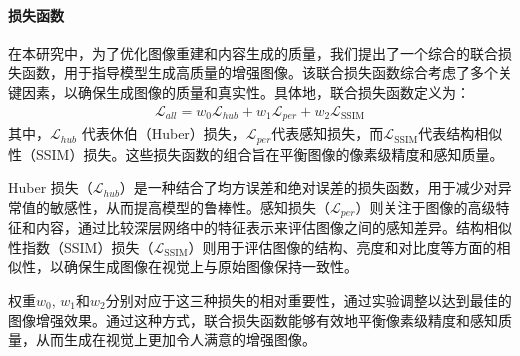 \documentclass[a4paper]{ctexart}
\begin{document}
	
	\paragraph{损失函数}
	
	在本研究中，为了优化图像重建和内容生成的质量，我们提出了一个综合的联合损失函数，用于指导模型生成高质量的增强图像。该联合损失函数综合考虑了多个关键因素，以确保生成图像的质量和真实性。具体地，联合损失函数定义为：
	\begin{equation}
		\begin{aligned}
			\mathcal{L}_{all} = w_0 \mathcal{L}_{hub} + w_1 \mathcal{L}_{per} + w_2 \mathcal{L}_{\text{SSIM}}
		\end{aligned}
		\label{eq: loss function}
	\end{equation}
	其中，$\mathcal{L}_{hub}$ 代表休伯（Huber）损失\cite{huber1992robust}，$\mathcal{L}_{per}$代表感知损失\cite{johnson2016perceptual}，而$\mathcal{L}_{\text{SSIM}}$代表结构相似性（SSIM）损失\cite{wang2004image}。这些损失函数的组合旨在平衡图像的像素级精度和感知质量。
	
	Huber 损失（$\mathcal{L}_{hub}$）是一种结合了均方误差和绝对误差的损失函数，用于减少对异常值的敏感性，从而提高模型的鲁棒性。感知损失（$\mathcal{L}_{per}$）则关注于图像的高级特征和内容，通过比较深层网络中的特征表示来评估图像之间的感知差异。结构相似性指数（SSIM）损失（$\mathcal{L}_{\text{SSIM}}$）则用于评估图像的结构、亮度和对比度等方面的相似性，以确保生成图像在视觉上与原始图像保持一致性。
	
	权重$w_0$, $w_1$和$w_2$分别对应于这三种损失的相对重要性，通过实验调整以达到最佳的图像增强效果。通过这种方式，联合损失函数能够有效地平衡像素级精度和感知质量，从而生成在视觉上更加令人满意的增强图像。
	
\end{document}
